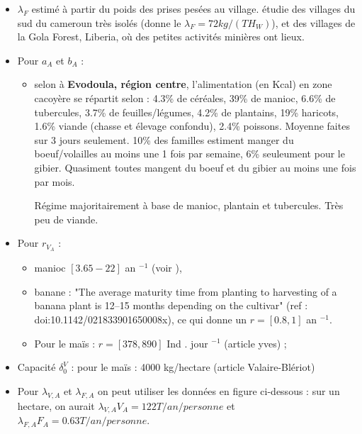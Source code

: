 \documentclass{article}
\newcommand{\lfa}{\lambda_{F, A}}
\newcommand{\lva}{\lambda_{V, A}}
\newcommand{\lfw}{\lambda_{F}}
\newcommand{\dv}{\delta_0^V}
\begin{document}
\begin{itemize}
\item $\lfw$ estimé à partir du poids des prises pesées au village. \cite{avila_interpreting_2019} étudie des villages du sud du cameroun très isolés (donne le $\lfw = 72 kg/(TH_W)$), et \cite{jones_consequences_2020} des villages de la Gola Forest, Liberia, où des petites activités minières ont lieux.

\item Pour $a_A$ et $b_A$ : 

\begin{itemize}
\item selon \cite{alimentation_adie_1996} à \textbf{Evodoula, région centre}, l'alimentation (en Kcal) en zone cacoyère se répartit selon : 4.3\% de céréales, 39\% de manioc, 6.6\% de tubercules, 3.7\% de feuilles/légumes, 4.2\% de plantains, 19\% haricots, 1.6\% viande (chasse et élevage confondu), 2.4\% poissons. Moyenne faites sur 3 jours seulement.
10\% des familles estiment manger du boeuf/volailles au moins une 1 fois par semaine, 6\% seuleument pour le gibier. Quasiment toutes mangent du boeuf et du gibier au moins une fois par mois.

Régime majoritairement à base de manioc, plantain et tubercules. Très peu de viande.
\end{itemize}

\item Pour $r_{V_A}$ : 
\begin{itemize}
\item manioc $[3.65 - 22]$ an $^{-1}$ (voir \cite{chapwanya_application_2021}),
\item banane : "The average maturity time from planting to harvesting of a banana plant is
12–15 months depending on the cultivar" (ref : doi:10.1142/021833901650008x), ce qui donne un $r = [0.8, 1]$ an $^{-1}$.
\item Pour le maïs : $r = [378,890]$ Ind . jour $^{-1}$ (article yves) ;
\end{itemize}  

\item Capacité $\dv$ : pour le maïs : 4000 kg/hectare (article Valaire-Blériot)

\item Pour $\lva$ et $\lfa$ on peut utiliser les données en figure ci-dessous : sur un hectare, on aurait $\lva V_A = 122 T / an / personne$  et $\lfa F_A = 0.63T /an /personne$.

\end{itemize}
\end{document}
